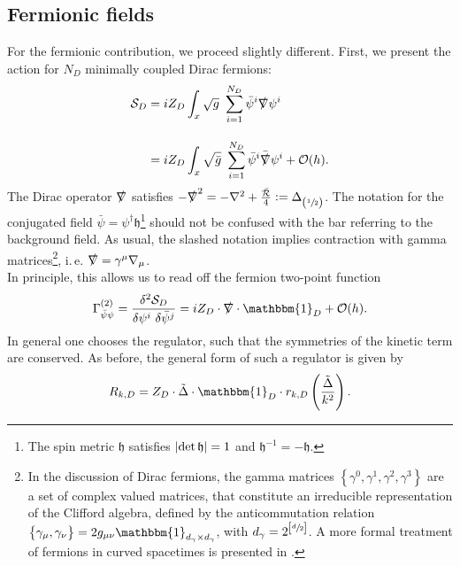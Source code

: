 \subsection{Fermionic  fields}
For the fermionic contribution, we  proceed slightly different. First, we present the action for $N_D$ minimally coupled Dirac fermions:
\begin{equation}
	\begin{aligned}
		\mathcal{S}_D &= iZ_D\int_x \sqrt{g} \ \sum\limits_{i=1}^{N_D}\bar{\psi}^{i}\slashed{\nabla}\psi^{i} \\[10pt]
		&=  iZ_D\int_x \sqrt{\bar{g}} \ \sum\limits_{i=1}^{N_D}\bar{\psi}^{i}\bar{\slashed{\nabla}}\psi^{i} + \mathcal{O}(h).
	\end{aligned}
\end{equation}
The Dirac operator $\slashed{\nabla}$ satisfies $-\slashed{\nabla}^2 = -\nabla^2 + \frac{\bar{\mathcal{R}}}{4} := \Delta_{\left(\sfrac{1}{2}\right)}$.
The notation for the conjugated field $\bar{\psi} = \psi^{\dagger}\mathfrak{h}$\footnote{The spin metric $\mathfrak{h}$ satisfies $\abs{\operatorname{det} \mathfrak{h}} = 1$ and $\mathfrak{h}^{-1} = -\mathfrak{h}$.} should not be confused with the bar referring to the background field. As usual, the slashed notation implies contraction with gamma matrices\footnote{In the discussion of Dirac fermions, the gamma matrices $\left\{\gamma^0, \gamma^1, \gamma^2, \gamma^3\right\}$ are a set of complex valued matrices, that constitute an irreducible representation of the Clifford algebra, defined by the anticommutation relation $\left\{\gamma_{\mu}, \gamma_{\nu}\right\}= 2g_{\mu\nu} \mathbbm{1}_{d_{\gamma}\times d_{\gamma}}$, with $d_{\gamma} = 2^{\left[\sfrac{d}{2}\right]}$. A more formal treatment of fermions in curved spacetimes is presented in \cite{LippoldtPHD}.}, i.\,e. $\slashed{\nabla} = \gamma^{\mu}\nabla_{\mu}$.  \\
In principle, this allows us to read off the fermion two-point function
\begin{align}
	\Gamma^{(2)}_{\bar{\psi}\psi} = \frac{\delta^2 \mathcal{S}_D}{\delta \psi^{i}\ \delta \bar{\psi}^{j}} = iZ_D\cdot\slashed{\nabla}\cdot\mathbbm{1}_D + \mathcal{O}(h).
\end{align}
In general one chooses the regulator, such that the symmetries of the kinetic term are conserved. As before, the general form of such a regulator is given by
\begin{align}
	R_{k,D} = Z_D\cdot\tilde{\Delta}\cdot\mathbbm{1}_D\cdot r_{k, D}\left(\frac{\tilde{\Delta}}{k^2}\right).
\end{align} 
